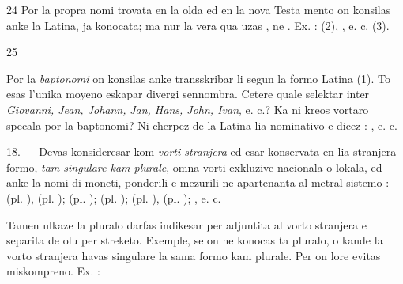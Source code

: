 \begin{VUpage}[28]{24}
Por la propra nomi trovata en la olda ed en la nova Testa\cc
mento on konsilas anke la  Latina, ja konocata;\nl
ma nur la vera qua uzas , ne . Ex. : \nl
{} (2), \nl
{}, e. c. (3).
\end{VUpage}

\begin{VUpage}[29]{25}

Por la \textit{baptonomi} on konsilas anke transskribar li segun\nl
la formo Latina (1). To esas l'unika moyeno eskapar divergi\nl
sennombra. Cetere quale selektar inter \textit{Giovanni, Jean, Johann,}\nl
\textit{Jan, Hans, John, Ivan}, e. c.? Ka ni kreos vortaro specala por\nl
la baptonomi? Ni cherpez de la Latina lia nominativo e dicez :\nl
{}\nl
{}\nl
{}, e. c.

\VUblanc{5.75pt}%
18. --- Devas konsideresar kom \textit{vorti stranjera} ed esar\nl
konservata en lia stranjera formo, \textit{tam singulare kam plurale},\nl
omna vorti exkluzive nacionala o lokala, ed anke la nomi\nl
di moneti, ponderili e mezurili ne apartenanta al metral\nl
sistemo : \nl
{} (pl. ),  (pl. \cc
{});  (pl. );  (pl. ); \nl
(pl. ),  (pl. ); \nl
{}, e. c.

Tamen ulkaze la pluralo darfas indikesar per  adjuntita\nl
al vorto stranjera e separita de olu per streketo. Exemple, se\nl
on ne konocas ta pluralo, o kande la vorto stranjera havas\nl
singulare la sama formo kam plurale. Per  on lore evitas\nl
miskompreno. Ex. : \nl
{}


\end{VUpage}
